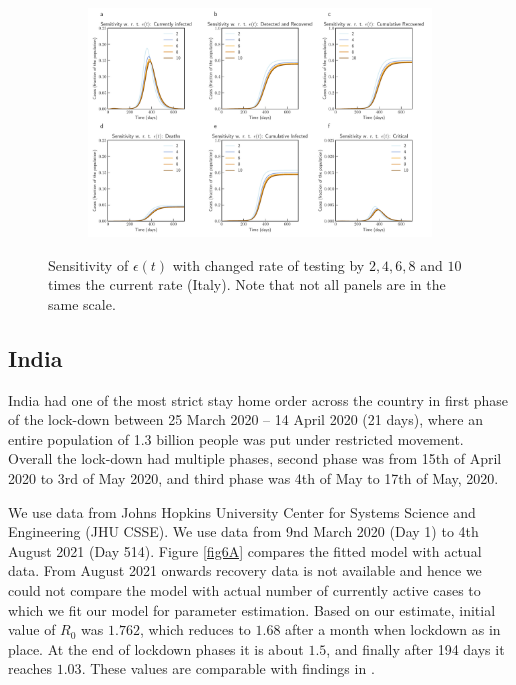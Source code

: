 \documentclass[10pt]{wlscirep}
\begin{document}
\begin{figure}[t!]
	\centering
	\begin{subfigure}[b]{\textwidth}
		\centering
		\includegraphics[width=1\linewidth]{Italy_sensitivity_epsilon.pdf}
	\end{subfigure}
	\caption{Sensitivity of $\epsilon(t)$ with changed rate of testing by $2, 4, 6, 8$ and $10$ times the current rate (Italy). Note that not all panels are in the same scale.}
	\label{fig3B} 
\end{figure}
%

\subsection*{India}
India had one of the most strict stay home order across the country in first phase of the lock-down between 25 March 2020 – 14 April 2020 (21 days), where an entire population of 1.3 billion people was put under restricted movement. Overall the lock-down had multiple phases, second phase was from 15th of April 2020 to 3rd of May 2020, and third phase was 4th of May to 17th of May, 2020.

We use data from Johns Hopkins University Center for Systems Science and Engineering (JHU CSSE). We use data from 9nd March 2020 (Day 1) to 4th August 2021 (Day 514). Figure \ref{fig6A} compares the fitted model with actual data. From August 2021 onwards  recovery data is not available and hence we could not compare the model with actual number of currently active cases  to which we fit our model for parameter estimation. Based on our estimate, initial value of $R_0$ was $1.762$, which reduces to $1.68$ after a month when lockdown as in place. At the end of lockdown phases it is about $1.5$, and finally after 194 days it reaches $1.03$. These values are comparable with findings in \cite{Chhabra2020.07.10.20150631,MARIMUTHU2020}.
\end{document}
